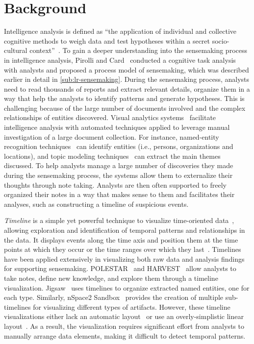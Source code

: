 \section{Background}
Intelligence analysis is defined as ``the application of individual and collective cognitive methods to weigh data and test hypotheses within a secret socio-cultural context''~\cite{Johnston2005}. To gain a deeper understanding into the sensemaking process in intelligence analysis, Pirolli and Card~\cite{Pirolli2005} conducted a cognitive task analysis with analysts and proposed a process model of sensemaking, which was described earlier in detail in \autoref{sub:lr-sensemaking}. During the sensemaking process, analysts need to read thousands of reports and extract relevant details, organize them in a way that help the analysts to identify patterns and generate hypotheses. This is challenging because of the large number of documents involved and the complex relationships of entities discovered. Visual analytics systems~\cite{Pioch2006,Wright2006,Stasko2007} facilitate intelligence analysis with automated techniques applied to leverage manual investigation of a large document collection. For instance, named-entity recognition techniques~\cite{Nadeau2007} can identify entities (i.e., persons, organizations and locations), and topic modeling techniques~\cite{Blei2003} can extract the main themes discussed. To help analysts manage a large number of discoveries they made during the sensemaking process, the systems allow them to externalize their thoughts through note taking. Analysts are then often supported to freely organized their notes in a way that makes sense to them and facilitates their analyses, such as constructing a timeline of suspicious events.

\emph{Timeline} is a simple yet powerful technique to visualize time-oriented data~\cite{Tufte1983}, allowing exploration and identification of temporal patterns and relationships in the data. It displays events along the time axis and position them at the time points at which they occur or the time ranges over which they last~\cite{Plaisant1996}. Timelines have been applied extensively in visualizing both raw data and analysis findings for supporting sensemaking. POLESTAR~\cite{Pioch2006} and HARVEST~\cite{Gotz2006} allow analysts to take notes, define new knowledge, and explore them through a timeline visualization. Jigsaw~\cite{Gorg2013} uses timelines to organize extracted named entities, one for each type. Similarly, nSpace2 Sandbox~\cite{SandboxTimeline2012} provides the creation of multiple sub-timelines for visualizing different types of artifacts. However, these timeline visualizations either lack an automatic layout~\cite{Pioch2006} or use an overly-simplistic linear layout~\cite{SandboxTimeline2012}. As a result, the visualization requires significant effort from analysts to manually arrange data elements, making it difficult to detect temporal patterns.

